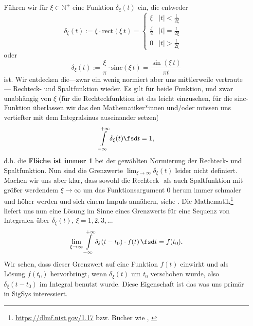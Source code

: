\begin{Werkzeug}
Führen wir für $\xi\in\mathbb{N}^+$ eine Funktion $\delta_\xi(t)$ ein, die entweder
\begin{equation}
\delta_\xi(t) := \xi \cdot \mathrm{rect}(\xi \, t) =
\begin{cases} \xi & |t| < \frac{1}{2 \xi} \\ \frac{\xi}{2} & |t| = \frac{1}{2 \xi} \\ 0 & |t| > \frac{1}{2 \xi} \end{cases}\quad
\end{equation}
oder
\begin{equation}
\delta_\xi(t) := \frac{\xi}{\pi} \cdot \mathrm{sinc}(\xi \, t) = \frac{\sin(\xi \, t)}{\pi t}
\end{equation}
ist.
Wir entdecken die---zwar ein wenig normiert aber uns mittlerweile vertraute---
Rechteck- und Spaltfunktion wieder.
%
Es gilt für beide Funktion, und zwar unabhängig von $\xi$ (für die
Rechteckfunktion ist das leicht einzusehen, für die sinc-Funktion überlassen wir
das den Mathematiker*innen und/oder müssen uns vertiefter mit dem Integralsinus
auseinander setzen)
\begin{equation}
\int\limits_{-\infty}^{+\infty} \delta_\xi(t) \fsd t = 1,
\end{equation}
d.h. die \textbf{Fläche ist immer 1} bei der gewählten Normierung der
Rechteck- und Spaltfunktion.
%
Nun sind die Grenzwerte
$\lim_{\xi\to\infty} \delta_\xi(t)$
leider nicht definiert.
%
Machen wir uns aber klar, dass sowohl die Rechteck- als auch Spaltfunktion mit
größer werdendem $\xi\to \infty$ um das Funktionsargument $0$ herum
immer schmaler und höher werden und sich
einem Impuls annähern, siehe .
%
Die Mathematik\footnote{\url{https://dlmf.nist.gov/1.17} bzw. Bücher wie
\cite[Kapitel 1.15]{Arfken2005}, \cite{Burg2013}}
liefert uns nun eine Lösung im Sinne eines Grenzwerts für eine
Sequenz von Integralen über $\delta_\xi(t)$, $\xi=1,2,3,...$
\begin{equation}
\lim_{\xi\to\infty} \int\limits_{-\infty}^{+\infty}
\delta_\xi(t-t_0) \cdot f(t) \, \fsd t = f(t_0).
\end{equation}
Wir sehen, dass dieser Grenzwert auf eine Funktion $f(t)$ einwirkt und als Lösung
$f(t_0)$ hervorbringt, wenn $\delta_\xi(t)$ um $t_0$ verschoben wurde, also
$\delta_\xi(t-t_0)$ im Integral benutzt wurde.
%
Diese Eigenschaft ist das was uns primär in SigSys interessiert.

\end{Werkzeug}
